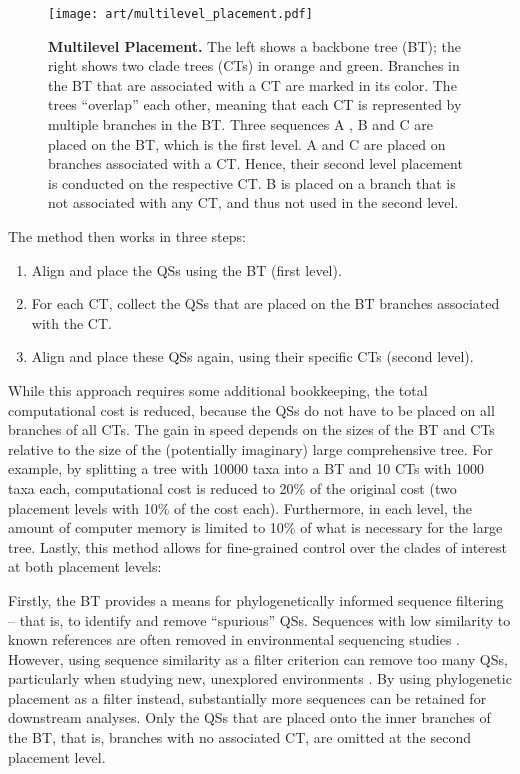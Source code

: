 \begin{figure}[hpbt]
    \centering
    \texttt{[image: art/multilevel\_placement.pdf]}
    \caption[Multilevel Placement]{
        \textbf{Multilevel Placement.}
        The left shows a backbone tree (BT); the right shows two clade trees (CTs) in orange and green.
        Branches in the BT that are associated with a CT are marked in its color.
        The trees ``overlap'' each other, meaning that each CT is represented by multiple branches in the BT.
        Three sequences {\sffamily A} , {\sffamily B} and {\sffamily C} are placed on the BT, which is the first level.
        {\sffamily A} and {\sffamily C} are placed on branches associated with a CT.
        Hence, their second level placement is conducted on the respective CT.
        {\sffamily B} is placed on a branch that is not associated with any CT,
        and thus not used in the second level.
    }
    \label{fig:multilevel_placement}
\end{figure}

The method then works in three steps:

\begin{enumerate}
    \item Align and place the \acp{QS} using the \ac{BT} (first level).
    \item For each \ac{CT}, collect the \acp{QS} that are placed on the \ac{BT} branches associated with the \ac{CT}.
    \item Align and place these \acp{QS} again, using their specific \acp{CT} (second level).
\end{enumerate}

While this approach requires some additional bookkeeping,
the total computational cost is reduced,
because the \acp{QS} do not have to be placed on all branches of all \acp{CT}.
The gain in speed depends on the sizes of the \ac{BT} and \acp{CT}
relative to the size of the (potentially imaginary) large comprehensive tree.
For example, by splitting a tree with \num{10 000} taxa into a \ac{BT} and \num{10} \acp{CT} with 1000 taxa each,
computational cost is reduced to 20\% of the original cost (two placement levels with 10\% of the cost each).
Furthermore, in each level, the amount of computer memory is limited to 10\% of what is necessary for the large tree.
Lastly, this method allows for fine-grained control over the clades of interest at both placement levels:

Firstly, the \ac{BT} provides a means for phylogenetically informed sequence filtering --
that is, to identify and remove ``spurious'' \acp{QS}.
Sequences with low similarity to known references are often removed in environmental sequencing studies \citep{Stoeck2010}.
However, using sequence similarity as a filter criterion can remove too many \acp{QS},
particularly when studying new, unexplored environments \citep{Mahe2017}.
By using phylogenetic placement as a filter instead, substantially more sequences can be retained for downstream analyses.
Only the \acp{QS} that are placed onto the inner branches of the \ac{BT},
that is, branches with no associated \ac{CT},
are omitted at the second placement level.

